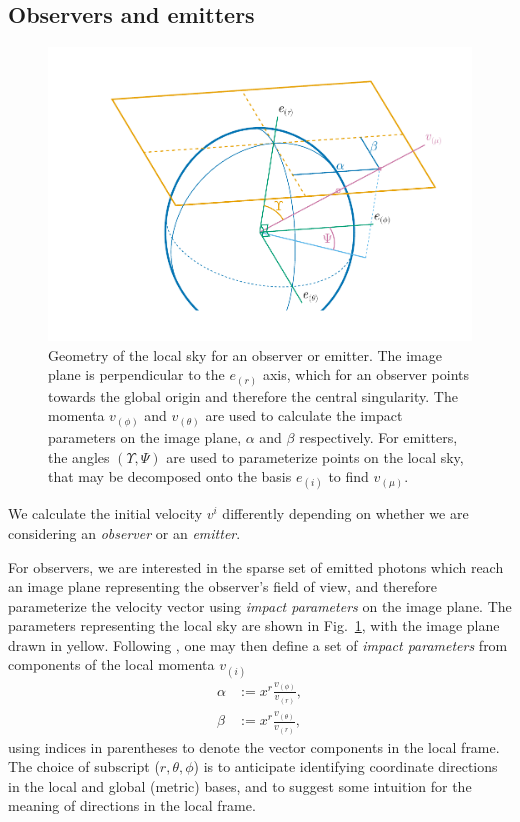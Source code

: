 \documentclass[fleqn,usenatbib]{mnras}
\begin{document}
\subsection{Observers and emitters}

\begin{figure}
    \centering
    \includegraphics[width=0.99\linewidth]{figures/skycoords.pdf}
    \caption{
    Geometry of the local sky for an observer or emitter. The image plane is
    perpendicular to the $e_{(r)}$ axis, which for an observer points towards
    the global origin and therefore the central singularity. The momenta
    $v_{(\phi)}$ and $v_{(\theta)}$ are used to calculate the impact parameters
    on the image plane, $\alpha$ and $\beta$ respectively. For emitters, the
    angles $(\Upsilon, \Psi)$ are used to parameterize points on the local sky,
    that may be decomposed onto the basis $e_{(i)}$ to find $v_{(\mu)}$.
    }
    \label{fig:observer-coordinates}
\end{figure}

We calculate the initial velocity $v^i$ differently depending on whether we are
considering an \emph{observer} or an \emph{emitter}.

For observers, we are interested in the sparse set of emitted photons which
reach an image plane representing the observer's field of view, and therefore
parameterize the velocity vector using \emph{impact parameters} on the image
plane. The parameters representing the local sky are shown in
Fig.~\ref{fig:observer-coordinates}, with the image plane drawn in yellow.
Following \cite{cunningham_optical_1973}, one may then define a set of
\emph{impact
parameters} from components of the local momenta $v_{(i)}$
\begin{align}
    \alpha &:=  x^r \frac{v_{(\phi)}}{v_{(r)}}, \\
    \beta &:= x^r \frac{v_{(\theta)}}{v_{(r)}},
\end{align}
using indices in parentheses to denote the vector components in the local
frame. The choice of subscript ($r, \theta, \phi$) is to anticipate identifying
coordinate directions in the local and global (metric) bases, and to suggest
some intuition for the meaning of directions in the local frame.
\end{document}
